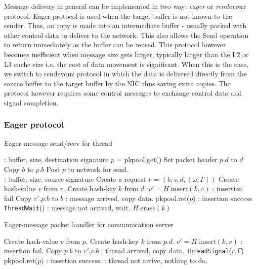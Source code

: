 Message delivery in general can be implemented in two way: \textit{eager} or \textit{rendevouz}
protocol. Eager protocol is used when the target buffer is not known to the
sender. Thus, an copy is made into an intermediate buffer - usually packed with
other control data to deliver to the network. This also allows the Send
operation to return immediately as the buffer can be reused.  This protocol
however becomes inefficient when message size gets larger, typically larger
than the L2 or L3 cache size i.e. the cost of data movement is significant.
When this is the case, we switch to rendevouz protocol in which the data is
delivered directly from the source buffer to the target buffer by the NIC thus
saving extra copies.  The protocol however requires some control messages to
exchange control data and signal completion.

\subsubsection{Eager protocol}

\begin{algorithm}
  \caption{Eager-message send/recv for thread}
  \label{algo:short}
  \begin{algorithmic}[1] %
     \Comment: buffer, size, destination signature 
      \State $p$ = pkpool.get()
      \State Set packet header $p.d$ to $d$
      \State Copy $b$ to $p.b$
      \State Post $p$ to network for send.
    \EndProcedure
    \\
     \Comment: buffer, size, source signature 
      \State Create a request $r$ = $(b,s,d, (\omega, \Gamma))$
      \State Create hash-value $v$ from $r$.
      \State Create hash-key $k$ from $d$.
      \State $v' = H.\text{insert}(k,v)$
        \Comment: insertion fail
        \State Copy $v'.p.b$ to $b$
        \Comment: message arrived, copy data.
        \State pkpool.ret($p$)
      \Else
        \Comment: insertion success
        \State \texttt{ThreadWait}()
        \Comment: message not arrived, wait.
      \EndIf
      \State $H.\text{erase}(k)$
    \EndProcedure
  \end{algorithmic}
\end{algorithm}

\begin{algorithm}
  \caption{Eager-message packet handler for communication server}
  \label{algo:server-short}
  \begin{algorithmic}[1]
      \State Create hash-value $v$ from $p$.
      \State Create hash-key $k$ from $p.d$.
      \State $v' = H.\text{insert}(k,v)$
        \Comment: insertion fail.
        \State Copy $p.b$ to $v'.r.b$
        \Comment: thread arrived, copy data.
        \State \texttt{ThreadSignal}($r.\Gamma$)
        \State pkpool.ret($p$)
      \Else
        \Comment: insertion success.
        \State \Return
        \Comment: thread not arrive, nothing to do.
      \EndIf
    \EndProcedure
  \end{algorithmic}
\end{algorithm}

